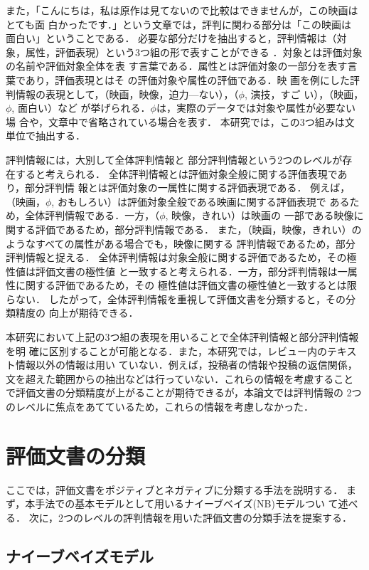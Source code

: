 \documentclass[japanese]{jnlp_1.3c}
\begin{document}
また，「こんにちは，私は原作は見てないので比較はできませんが，この映画はとても面
白かったです．」という文章では，評判に関わる部分は「この映画は
面白い」ということである．
必要な部分だけを抽出すると，評判情報は（対象，属性，評価表現）という3つ組の形で表すことができる
\cite{iida,tateishi}．対象とは評価対象の名前や評価対象全体を表
す言葉である．属性とは評価対象の一部分を表す言葉であり，評価表現とはそ
の評価対象や属性の評価である．映
画を例にした評判情報の表現として，（映画，映像，迫力—ない），（$\phi$, 演技，すご
い），（映画，$\phi$, 面白い）など
が挙げられる．$\phi$は，実際のデータでは対象や属性が必要ない場
合や，文章中で省略されている場合を表す．
本研究では，この3つ組みは文単位で抽出する．

評判情報には，大別して全体評判情報と
部分評判情報という2つのレベルが存
在すると考えられる．
全体評判情報とは評価対象全般に関する評価表現であり，部分評判情
報とは評価対象の一属性に関する評価表現である．
例えば，（映画，$\phi$, おもしろい）は評価対象全般である映画に関する評価表現で
あるため，全体評判情報である．一方，（$\phi$, 映像，きれい）は映画の
一部である映像に関する評価であるため，部分評判情報である．
また，（映画，映像，きれい）のようなすべての属性がある場合でも，映像に関する
評判情報であるため，部分評判情報と捉える．
全体評判情報は対象全般に関する評価であるため，その極性値は評価文書の極性値
と一致すると考えられる．一方，部分評判情報は一属性に関する評価であるため，その
極性値は評価文書の極性値と一致するとは限らない．
したがって，全体評判情報を重視して評価文書を分類すると，その分類精度の
向上が期待できる．

本研究において上記の3つ組の表現を用いることで全体評判情報と部分評判情報を明
確に区別することが可能となる．また，本研究では，レビュー内のテキスト情報以外の情報は用い
ていない．例えば，投稿者の情報や投稿の返信関係，
文を超えた範囲からの抽出などは行っていない．これらの情報を考慮すること
で評価文書の分類精度が上がることが期待できるが，本論文では評判情報の
2つのレベルに焦点をあてているため，これらの情報を考慮しなかった．


\section{評価文書の分類}
ここでは，評価文書をポジティブとネガティブに分類する手法を説明する．
\pagebreak
まず，本手法での基本モデルとして用いるナイーブベイズ(NB)モデルつい
て述べる\cite{dave}．
次に，2つのレベルの評判情報を用いた評価文書の分類手法を提案する．

\subsection{ナイーブベイズモデル}
\end{document}
